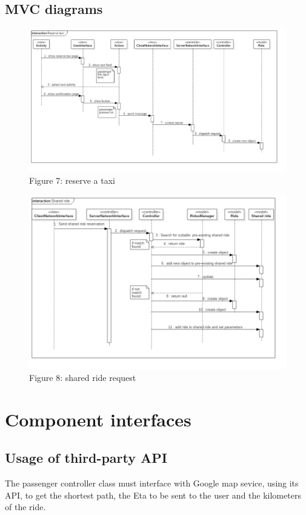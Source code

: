 	\subsection{MVC diagrams}
\begin{figure} [h]
\centering\includegraphics[scale=0.5]{Sequence Diagrams/MVC_reserve_taxi.png}
\caption{Figure 7: reserve a taxi }
\end{figure}

\begin{figure} [h]
\centering\includegraphics[scale=0.5]{Sequence Diagrams/MVC_Shared_ride.png}
\caption{Figure 8: shared ride request }
\end{figure}

\section{Component interfaces}

\subsection{Usage of third-party API}
The passenger controller class must interface with Google map sevice, using its API, to get the shortest path, the Eta to be sent to the user and the 
kilometers of the ride.

